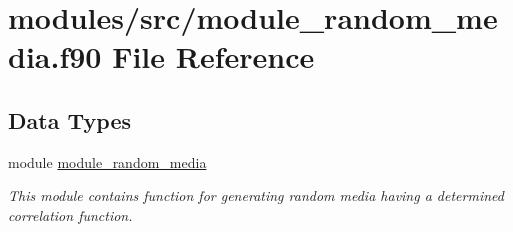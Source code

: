 \hypertarget{module__random__media_8f90}{
\section{modules/src/module\-\_\-random\-\_\-media.f90 \-File \-Reference}
\label{module__random__media_8f90}
}
\subsection*{\-Data \-Types}
\begin{DoxyCompactItemize}
\item 
module \hyperlink{classmodule__random__media}{module\-\_\-random\-\_\-media}
\begin{DoxyCompactList}\small\item\em \-This module contains function for generating random media having a determined correlation function. \end{DoxyCompactList}\end{DoxyCompactItemize}
